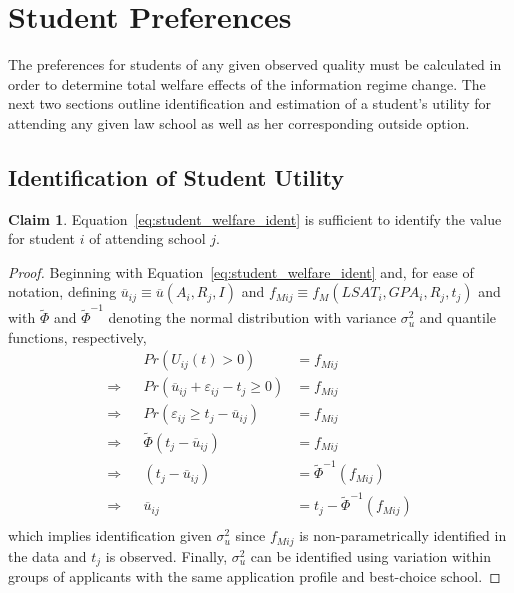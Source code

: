 \documentclass[12pt]{article}
\theoremstyle{definition}
\newtheorem{claim}{Claim}[section]
\begin{document}

\section{Student Preferences}
\label{app:outside}
The preferences for students of any given observed quality must be calculated in order to determine total welfare effects of the information regime change. The next two sections outline identification and estimation of a student's utility for attending any given law school as well as her corresponding outside option.

\subsection{Identification of Student Utility}
\label{app:id_outside}
\begin{claim}
  Equation~\eqref{eq:student_welfare_ident} is sufficient to identify the value for student $i$ of attending school $j$.
\end{claim}
\begin{proof}
  Beginning with Equation~\eqref{eq:student_welfare_ident} and, for ease of notation, defining $\overline{u}_{ij} \equiv \overline{u}(A_i, R_j, I)$ and $f_{Mij} \equiv f_M(LSAT_i, GPA_i, R_j, t_j)$ and with $\tilde{\Phi}$ and $\tilde{\Phi}^{-1}$ denoting the normal distribution with variance $\sigma_u^2$ and quantile functions, respectively,
  \begin{align*}
    &&Pr(U_{ij}(t) > 0) &= f_{Mij} \\
    \Rightarrow&& Pr(\overline{u}_{ij} + \varepsilon_{ij} - t_j \geq 0) &= f_{Mij} \\
    \Rightarrow&& Pr(\varepsilon_{ij} \geq t_j - \overline{u}_{ij} ) &= f_{Mij} \\
    \Rightarrow&& \tilde{\Phi}(t_j - \overline{u}_{ij} ) &= f_{Mij} \\
    \Rightarrow&& (t_j - \overline{u}_{ij} ) &= \tilde{\Phi}^{-1}(f_{Mij}) \\
    \Rightarrow&& \overline{u}_{ij} &= t_j - \tilde{\Phi}^{-1}(f_{Mij})\\
  \end{align*}
  which implies identification given $\sigma_u^2$ since $f_{Mij}$ is non-parametrically identified in the data and $t_j$ is observed. Finally, $\sigma_u^2$ can be identified using variation within groups of applicants with the same application profile and best-choice school.
\end{proof}
\end{document}
